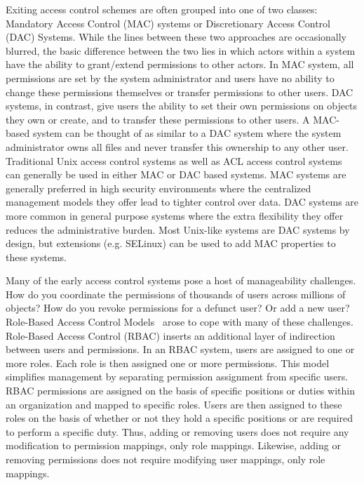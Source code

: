 Exiting access control schemes are often grouped into one of two
classes: Mandatory Access Control (MAC) systems or Discretionary
Access Control (DAC) Systems. While the lines between these two
approaches are occasionally blurred, the basic difference between the
two lies in which actors within a system have the ability to
grant/extend permissions to other actors. In MAC system, all
permissions are set by the system administrator and users have no
ability to change these permissions themselves or transfer permissions
to other users. DAC systems, in contrast, give users the ability to
set their own permissions on objects they own or create, and to
transfer these permissions to other users. A MAC-based system can be
thought of as similar to a DAC system where the system administrator
owns all files and never transfer this ownership to any other
user. Traditional Unix access control systems as well as ACL access
control systems can generally be used in either MAC or DAC based
systems. MAC systems are generally preferred in high security
environments where the centralized management models they offer lead
to tighter control over data. DAC systems are more common in general
purpose systems where the extra flexibility they offer reduces the
administrative burden. Most Unix-like systems are DAC systems by
design, but extensions (e.g. SELinux) can be used to add MAC
properties to these systems.

Many of the early access control systems pose a host of manageability
challenges. How do you coordinate the permissions of thousands of
users across millions of objects? How do you revoke permissions for a
defunct user? Or add a new user?  Role-Based Access Control
Models~\cite{sandhu1996} arose to cope with many of these challenges.
Role-Based Access Control (RBAC) inserts an additional layer of
indirection between users and permissions. In an RBAC system, users
are assigned to one or more roles. Each role is then assigned one or
more permissions. This model simplifies management by separating
permission assignment from specific users. RBAC permissions are
assigned on the basis of specific positions or duties within an
organization and mapped to specific roles. Users are then assigned to
these roles on the basis of whether or not they hold a specific
positions or are required to perform a specific duty. Thus, adding or
removing users does not require any modification to permission
mappings, only role mappings. Likewise, adding or removing permissions
does not require modifying user mappings, only role mappings.

